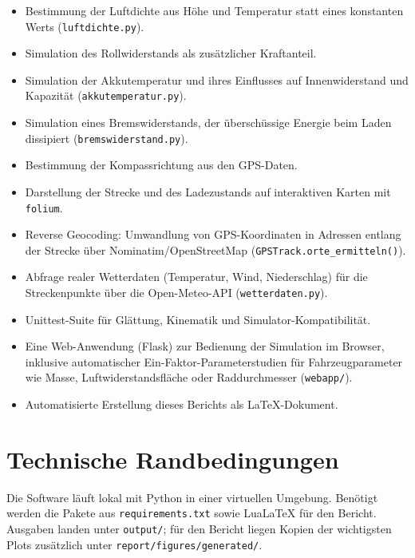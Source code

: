 \begin{itemize}
  \item Bestimmung der Luftdichte aus Höhe und Temperatur statt eines konstanten Werts (\texttt{luftdichte.py}).
  \item Simulation des Rollwiderstands als zusätzlicher Kraftanteil.
  \item Simulation der Akkutemperatur und ihres Einflusses auf Innenwiderstand und Kapazität (\texttt{akkutemperatur.py}).
  \item Simulation eines Bremswiderstands, der überschüssige Energie beim Laden dissipiert (\texttt{bremswiderstand.py}).
  \item Bestimmung der Kompassrichtung aus den GPS-Daten.
  \item Darstellung der Strecke und des Ladezustands auf interaktiven Karten mit \texttt{folium}.
  \item Reverse Geocoding: Umwandlung von GPS-Koordinaten in Adressen entlang der Strecke über Nominatim/OpenStreetMap (\texttt{GPSTrack.orte\_ermitteln()}).
  \item Abfrage realer Wetterdaten (Temperatur, Wind, Niederschlag) für die Streckenpunkte über die Open-Meteo-API (\texttt{wetterdaten.py}).
  \item Unittest-Suite für Glättung, Kinematik und Simulator-Kompatibilität.
  \item Eine Web-Anwendung (Flask) zur Bedienung der Simulation im Browser, inklusive automatischer Ein-Faktor-Parameterstudien für Fahrzeugparameter wie Masse, Luftwiderstandsfläche oder Raddurchmesser (\texttt{webapp/}).
  \item Automatisierte Erstellung dieses Berichts als \LaTeX-Dokument.
\end{itemize}

\section{Technische Randbedingungen}

Die Software läuft lokal mit Python in einer virtuellen Umgebung. Benötigt werden die Pakete aus \texttt{requirements.txt} sowie LuaLaTeX für den Bericht. Ausgaben landen unter \texttt{output/}; für den Bericht liegen Kopien der wichtigsten Plots zusätzlich unter \texttt{report/figures/generated/}.

